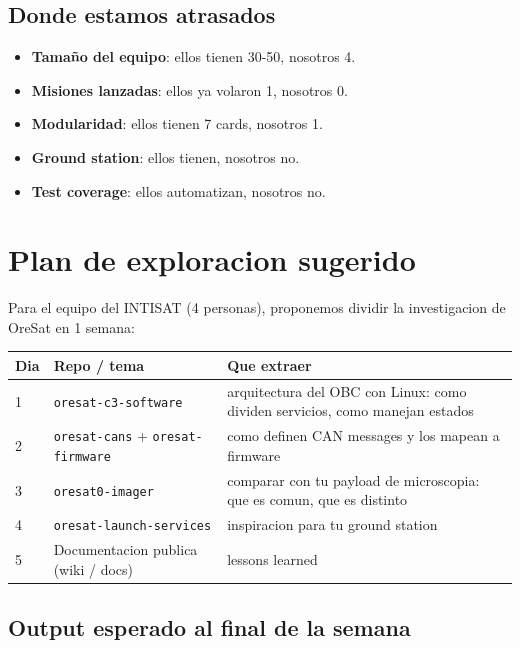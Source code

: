 \documentclass[11pt,a4paper,oneside]{report}
\begin{document}
\section{Donde estamos atrasados}

\begin{itemize}[leftmargin=2em]
  \item \textbf{Tamaño del equipo}: ellos tienen 30-50, nosotros 4.
  \item \textbf{Misiones lanzadas}: ellos ya volaron 1, nosotros 0.
  \item \textbf{Modularidad}: ellos tienen 7 cards, nosotros 1.
  \item \textbf{Ground station}: ellos tienen, nosotros no.
  \item \textbf{Test coverage}: ellos automatizan, nosotros no.
\end{itemize}

\chapter{Plan de exploracion sugerido}

Para el equipo del INTISAT (4 personas), proponemos dividir la
investigacion de OreSat en 1 semana:

\begin{center}
\begin{tabular}{p{1.2cm}p{5.5cm}p{7cm}}
\toprule
\textbf{Dia} & \textbf{Repo / tema} & \textbf{Que extraer} \\
\midrule
1 & \texttt{oresat-c3-software} & arquitectura del OBC con Linux: como dividen servicios, como manejan estados \\
2 & \texttt{oresat-cans} + \texttt{oresat-firmware} & como definen CAN messages y los mapean a firmware \\
3 & \texttt{oresat0-imager} & comparar con tu payload de microscopia: que es comun, que es distinto \\
4 & \texttt{oresat-launch-services} & inspiracion para tu ground station \\
5 & Documentacion publica (wiki / docs) & lessons learned \\
\bottomrule
\end{tabular}
\end{center}

\section{Output esperado al final de la semana}
\end{document}
